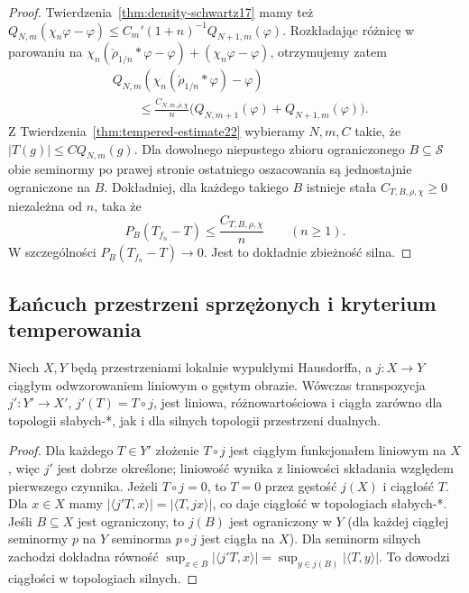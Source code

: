 \begin{proof}
Twierdzenia~\ref{thm:density-schwartz17} mamy też
$Q_{N,m}(\chi_n\varphi-\varphi)
\le C_m'(1+n)^{-1}Q_{N+1,m}(\varphi)$.
Rozkładając różnicę w parowaniu na
$\chi_n(\check\rho_{1/n}*\varphi-\varphi)
+(\chi_n\varphi-\varphi)$, otrzymujemy zatem
\[
\begin{aligned}
 &Q_{N,m}(\chi_n(\check\rho_{1/n}*\varphi)-\varphi)\\
 &\qquad\le \frac{C_{N,m,\rho,\chi}}{n}
 \bigl(Q_{N,m+1}(\varphi)+Q_{N+1,m}(\varphi)\bigr).
\end{aligned}
\]
Z Twierdzenia~\ref{thm:tempered-estimate22} wybieramy
$N,m,C$ takie, że $|T(g)|\le C Q_{N,m}(g)$.
Dla dowolnego niepustego zbioru ograniczonego
$B\subseteq\mathcal S$ obie seminormy po prawej stronie
ostatniego oszacowania są jednostajnie ograniczone na $B$.
Dokładniej, dla każdego takiego $B$ istnieje stała
$C_{T,B,\rho,\chi}\ge0$ niezależna od $n$, taka że
\[
 P_B(T_{f_n}-T)\le \frac{C_{T,B,\rho,\chi}}{n}
 \qquad(n\ge1).
\]
W szczególności $P_B(T_{f_n}-T)\to0$.
Jest to dokładnie zbieżność silna.
\end{proof}

\subsection{Łańcuch przestrzeni sprzężonych i kryterium temperowania}

\begin{lemat}
\label{lem:transpozycja25}
Niech $X,Y$ będą przestrzeniami lokalnie wypukłymi
Hausdorffa, a $j:X\to Y$ ciągłym odwzorowaniem liniowym
o gęstym obrazie. Wówczas transpozycja
$j':Y'\to X'$, $j'(T)=T\circ j$, jest liniowa,
różnowartościowa i ciągła zarówno dla topologii słabych-*, jak i dla
silnych topologii przestrzeni dualnych.
\end{lemat}
\begin{proof}
Dla każdego $T\in Y'$ złożenie $T\circ j$ jest ciągłym
funkcjonałem liniowym na $X$, więc $j'$ jest dobrze
określone; liniowość wynika z liniowości składania
względem pierwszego czynnika. Jeżeli $T\circ j=0$,
to $T=0$ przez gęstość $j(X)$ i ciągłość $T$.
Dla $x\in X$ mamy
$|\langle j'T,x\rangle|=|\langle T,jx\rangle|$,
co daje ciągłość w topologiach słabych-*.
Jeśli $B\subseteq X$ jest ograniczony, to $j(B)$ jest
ograniczony w $Y$ (dla każdej ciągłej seminormy $p$
na $Y$ seminorma $p\circ j$ jest ciągła na $X$).
Dla seminorm silnych zachodzi dokładna równość
$\sup_{x\in B}|\langle j'T,x\rangle|
= \sup_{y\in j(B)}|\langle T,y\rangle|$.
To dowodzi ciągłości w topologiach silnych.
\end{proof}

